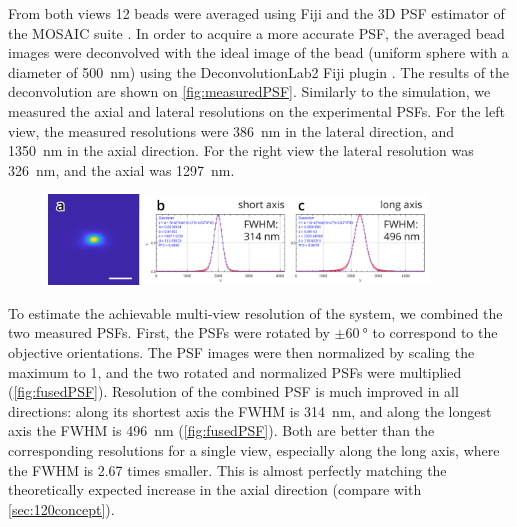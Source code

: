     From both views 12 beads were averaged using Fiji \cite{schindelin_fiji:_2012} and the 3D PSF estimator of the MOSAIC suite \cite{cardinale_imagej_2010}. In order to acquire a more accurate PSF, the averaged bead images were deconvolved with the ideal image of the bead (uniform sphere with a diameter of \SI{500}{nm}) using the DeconvolutionLab2 Fiji plugin \cite{sage_deconvolutionlab2:_2017}. The results of the deconvolution are shown on \autoref{fig:measuredPSF}. Similarly to the simulation, we measured the axial and lateral resolutions on the experimental PSFs. For the left view, the measured resolutions were \SI{386}{nm} in the lateral direction, and \SI{1350}{nm} in the axial direction. For the right view the lateral resolution was \SI{326}{nm}, and the axial was \SI{1297}{nm}.

    \begin{figure}
      \centering
      \includegraphics[width=0.9\textwidth]{beads/fusedPSF}
      \label{fig:fusedPSF}
    \end{figure}
    
    To estimate the achievable multi-view resolution of the system, we combined the two measured PSFs. First, the PSFs were rotated by $\pm \SI{60}{\degree}$ to correspond to the objective orientations. The PSF images were then normalized by scaling the maximum to 1, and the two rotated and normalized PSFs were multiplied (\autoref{fig:fusedPSF}). Resolution of the combined PSF is much improved in all directions: along its shortest axis the FWHM is \SI{314}{nm}, and along the longest axis the FWHM is \SI{496}{nm} (\autoref{fig:fusedPSF}). Both are better than the corresponding resolutions for a single view, especially along the long axis, where the FWHM is 2.67 times smaller. This is almost perfectly matching the theoretically expected increase in the axial direction (compare with \autoref{sec:120concept}).


